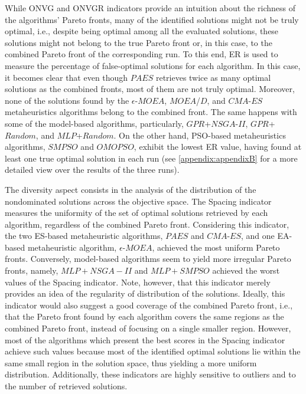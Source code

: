 While \ac{ONVG} and \ac{ONVGR} indicators provide an intuition about the richness of the algorithms' Pareto fronts, many of the identified solutions might not be truly optimal, i.e., despite being optimal among all the evaluated solutions, these solutions might not belong to the true Pareto front or, in this case, to the combined Pareto front of the corresponding run. To this end, \ac{ER} is used to measure the percentage of false-optimal solutions for each algorithm. In this case, it becomes clear that even though $PAES$ retrieves twice as many optimal solutions as the combined fronts, most of them are not truly optimal. Moreover, none of the solutions found by the $\epsilon$-$MOEA$, $MOEA$/$D$, and $CMA$-$ES$ metaheuristics algorithms belong to the combined front. The same happens with some of the model-based algorithms, particularly, $GPR$+$NSGA$-$II$, $GPR$+$Random$, and $MLP$+$Random$. On the other hand, \ac{PSO}-based metaheuristics algorithms, $SMPSO$ and $OMOPSO$, exhibit the lowest \ac{ER} value, having found at least one true optimal solution in each run (see \cref{appendix:appendixB} for a more detailed view over the results of the three runs).

The diversity aspect consists in the analysis of the distribution of the nondominated solutions across the objective space. The Spacing indicator measures the uniformity of the set of optimal solutions retrieved by each algorithm, regardless of the combined Pareto front. Considering this indicator, the two \ac{ES}-based metaheuristic algorithms, $PAES$ and $CMA$-$ES$, and one \ac{EA}-based metaheuristic algorithm, $\epsilon$-$MOEA$, achieved the most uniform Pareto fronts. Conversely, model-based algorithms seem to yield more irregular Pareto fronts, namely, $MLP+NSGA-II$ and $MLP+SMPSO$ achieved the worst values of the Spacing indicator. Note, however, that this indicator merely provides an idea of the regularity of distribution of the solutions. Ideally, this indicator would also suggest a good coverage of the combined Pareto front, i.e., that the Pareto front found by each algorithm covers the same regions as the combined Pareto front, instead of focusing on a single smaller region. However, most of the algorithms which present the best scores in the Spacing indicator achieve such values because most of the identified optimal solutions lie within the same small region in the solution space, thus yielding a more uniform distribution. Additionally, these indicators are highly sensitive to outliers and to the number of retrieved solutions. %

